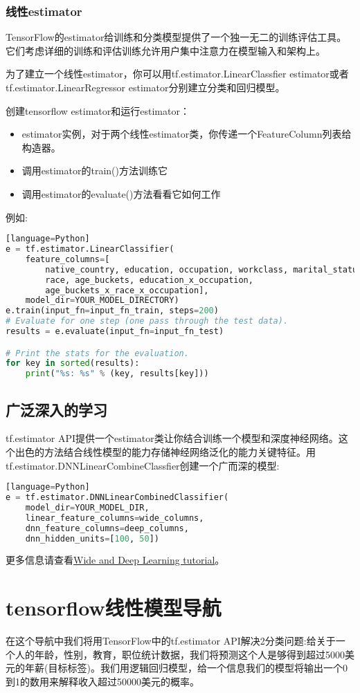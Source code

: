 \subsubsection{线性estimator}
TensorFlow的estimator给训练和分类模型提供了一个独一无二的训练评估工具。它们考虑详细的训练和评估训练允许用户集中注意力在模型输入和架构上。

为了建立一个线性estimator，你可以用tf.estimator.LinearClassfier estimator或者tf.estimator.LinearRegressor estimator分别建立分类和回归模型。

创建tensorflow estimator和运行estimator：
\begin{itemize}
  \item estimator实例，对于两个线性estimator类，你传递一个FeatureColumn列表给构造器。
  \item 调用estimator的train()方法训练它
  \item 调用estimator的evaluate()方法看看它如何工作
\end{itemize}
例如:
\begin{lstlisting}[language=Python][language=Python]
e = tf.estimator.LinearClassifier(
    feature_columns=[
        native_country, education, occupation, workclass, marital_status,
        race, age_buckets, education_x_occupation,
        age_buckets_x_race_x_occupation],
    model_dir=YOUR_MODEL_DIRECTORY)
e.train(input_fn=input_fn_train, steps=200)
# Evaluate for one step (one pass through the test data).
results = e.evaluate(input_fn=input_fn_test)

# Print the stats for the evaluation.
for key in sorted(results):
    print("%s: %s" % (key, results[key]))
\end{lstlisting}
\subsection{广泛深入的学习}
tf.estimator API提供一个estimator类让你结合训练一个模型和深度神经网络。这个出色的方法结合线性模型的能力存储神经网络泛化的能力关键特征。用tf.estimator.DNNLinearCombineClassfier创建一个广而深的模型:
\begin{lstlisting}[language=Python][language=Python]
e = tf.estimator.DNNLinearCombinedClassifier(
    model_dir=YOUR_MODEL_DIR,
    linear_feature_columns=wide_columns,
    dnn_feature_columns=deep_columns,
    dnn_hidden_units=[100, 50])
\end{lstlisting}
更多信息请查看\href{https://www.tensorflow.org/tutorials/wide_and_deep}{Wide and Deep Learning tutorial}。
\section{tensorflow线性模型导航}
在这个导航中我们将用TensorFlow中的tf.estimator API解决2分类问题:给关于一个人的年龄，性别，教育，职位统计数据，我们将预测这个人是够得到超过5000美元的年薪(目标标签)。我们用逻辑回归模型，给一个信息我们的模型将输出一个0到1的数用来解释收入超过50000美元的概率。

